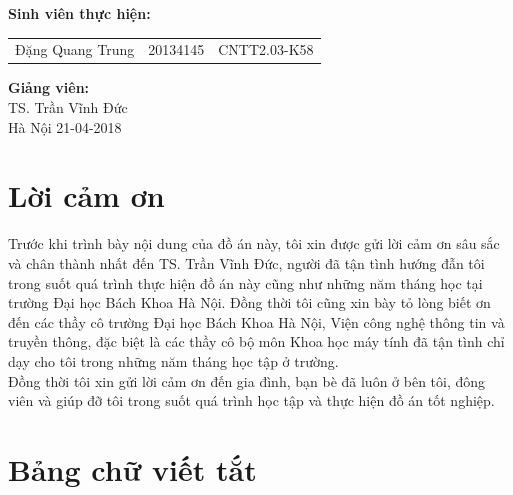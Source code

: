\documentclass[a4paper,12pt]{report}
\renewcommand{\contentsname}{Mục lục}
\begin{document}
\begin{center}
\hspace{-5cm}\fontsize{14}{16}\selectfont \textbf{Sinh viên thực hiện:}\\[0.1cm] 
\begin{longtable}{l c c}
Đặng Quang Trung & 20134145 & CNTT2.03-K58 
\end{longtable}
\vspace{0.3cm}
\hspace{-8.5cm}\fontsize{14}{16}\selectfont \textbf{Giảng viên:}\\[0.1cm]
\hspace{-2.7cm}\fontsize{14}{16}\selectfont TS. Trần Vĩnh Đức \\[3cm]
\fontsize{16}{19}\selectfont Hà Nội 21-04-2018
\end{center}
\chapter*{Lời cảm ơn}
Trước khi trình bày nội dung của đồ án này, tôi xin được gửi lời cảm ơn sâu sắc và chân thành nhất đến TS. Trần Vĩnh Đức, người đã tận tình hướng đẫn tôi trong suốt quá trình thực hiện đồ án này cũng như những năm tháng học tại trường Đại học Bách Khoa Hà Nội. Đồng thời tôi cũng xin bày tỏ lòng biết ơn đến các thầy cô trường Đại học Bách Khoa Hà Nội, Viện công nghệ thông tin và truyền thông, đặc biệt là các thầy cô bộ môn Khoa học máy tính đã tận tình chỉ dạy cho tôi trong những năm tháng học tập ở trường. \\ 

Đồng thời tôi xin gửi lời cảm ơn đến gia đình, bạn bè đã luôn ở bên tôi, đông viên và giúp đỡ tôi trong suốt quá trình học tập và thực hiện đồ án tốt nghiệp. 

\newpage
\pdfbookmark{\contentsname}{toc}

\tableofcontents
\newpage
\chapter*{Bảng chữ viết tắt}
\printacronyms[include-classes=abbrev,heading=none]

\listoffigures
{}
\end{document}
